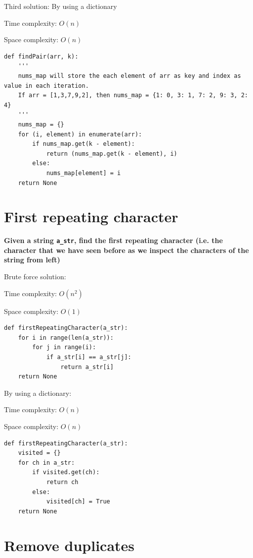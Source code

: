 \documentclass[a4paper,11pt]{book}
\begin{document}
\noindent Third solution: By using a dictionary

\noindent Time complexity: $O(n)$

\noindent Space complexity: $O(n)$

\begin{lstlisting}
def findPair(arr, k):
    '''
    nums_map will store the each element of arr as key and index as value in each iteration.
    If arr = [1,3,7,9,2], then nums_map = {1: 0, 3: 1, 7: 2, 9: 3, 2: 4}
    '''
    nums_map = {}
    for (i, element) in enumerate(arr):
        if nums_map.get(k - element):
            return (nums_map.get(k - element), i)
        else:
            nums_map[element] = i
    return None
\end{lstlisting}

\newpage
\section{First repeating character}

\textbf{Given a string \lstinline{a_str}, find the first repeating character (i.e. the character that we have seen before as we inspect the characters of the string from left)}
\vspace{5mm}

\noindent Brute force solution:

\noindent Time complexity: $O(n^2)$

\noindent Space complexity: $O(1)$

\begin{lstlisting}
def firstRepeatingCharacter(a_str):
    for i in range(len(a_str)):
        for j in range(i):
            if a_str[i] == a_str[j]:
                return a_str[i]
    return None
\end{lstlisting}

\noindent By using a dictionary:

\noindent Time complexity: $O(n)$

\noindent Space complexity: $O(n)$

\begin{lstlisting}
def firstRepeatingCharacter(a_str):
    visited = {}
    for ch in a_str:
        if visited.get(ch):
            return ch
        else:
            visited[ch] = True
    return None
\end{lstlisting}

\newpage
\section{Remove duplicates}
\end{document}
